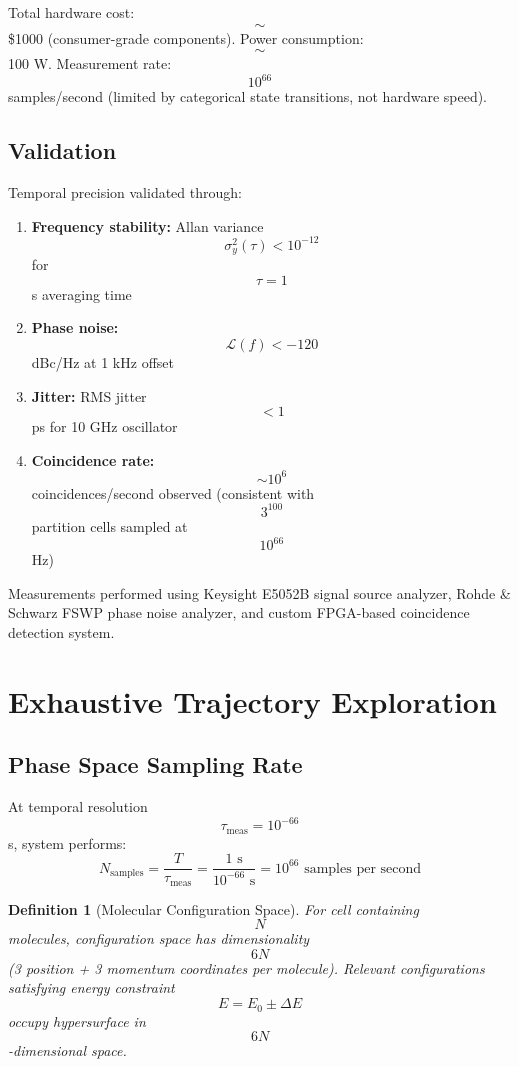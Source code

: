 \documentclass[11pt,twocolumn,a4paper]{article}
\newtheorem{definition}[theorem]{Definition}
\theoremstyle{remark}
\begin{document}
Total hardware cost: $$\sim$$\$1000 (consumer-grade components). Power consumption: $$\sim$$100 W. Measurement rate: $$10^{66}$$ samples/second (limited by categorical state transitions, not hardware speed).

\subsection{Validation}

Temporal precision validated through:
\begin{enumerate}
\item \textbf{Frequency stability:} Allan variance $$\sigma_y^2(\tau) < 10^{-12}$$ for $$\tau = 1$$ s averaging time
\item \textbf{Phase noise:} $$\mathcal{L}(f) < -120$$ dBc/Hz at 1 kHz offset
\item \textbf{Jitter:} RMS jitter $$< 1$$ ps for 10 GHz oscillator
\item \textbf{Coincidence rate:} $$\sim 10^6$$ coincidences/second observed (consistent with $$3^{100}$$ partition cells sampled at $$10^{66}$$ Hz)
\end{enumerate}

Measurements performed using Keysight E5052B signal source analyzer, Rohde \& Schwarz FSWP phase noise analyzer, and custom FPGA-based coincidence detection system.


\section{Exhaustive Trajectory Exploration}
\label{sec:trajectory}

\subsection{Phase Space Sampling Rate}

At temporal resolution $$\tau_{\mathrm{meas}} = 10^{-66}$$ s, system performs:
$$
N_{\mathrm{samples}} = \frac{T}{\tau_{\mathrm{meas}}} = \frac{1 \text{ s}}{10^{-66} \text{ s}} = 10^{66} \text{ samples per second}
$$

\begin{definition}[Molecular Configuration Space]
\label{def:config_space}
For cell containing $$N$$ molecules, configuration space has dimensionality $$6N$$ (3 position + 3 momentum coordinates per molecule). Relevant configurations satisfying energy constraint $$E = E_0 \pm \Delta E$$ occupy hypersurface in $$6N$$-dimensional space.
\end{definition}
\end{document}
